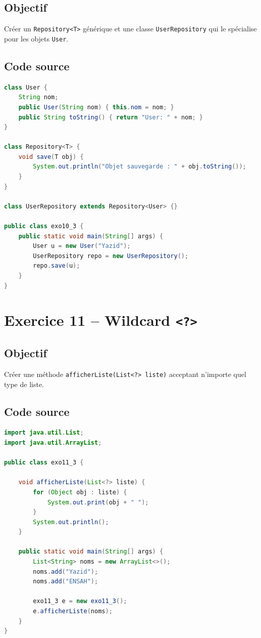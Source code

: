 \subsection{Objectif}

Créer un \texttt{Repository<T>} générique et une classe
\texttt{UserRepository} qui le spécialise pour les objets \texttt{User}.

\subsection{Code source}

\begin{lstlisting}[language=Java, caption={exo10\_3.java -- Repository générique}]
class User {
    String nom;
    public User(String nom) { this.nom = nom; }
    public String toString() { return "User: " + nom; }
}

class Repository<T> {
    void save(T obj) {
        System.out.println("Objet sauvegarde : " + obj.toString());
    }
}

class UserRepository extends Repository<User> {}

public class exo10_3 {
    public static void main(String[] args) {
        User u = new User("Yazid");
        UserRepository repo = new UserRepository();
        repo.save(u);
    }
}
\end{lstlisting}

\section{Exercice 11 -- Wildcard \texttt{<?>}}

\subsection{Objectif}

Créer une méthode \texttt{afficherListe(List<?> liste)} acceptant
n'importe quel type de liste.

\subsection{Code source}

\begin{lstlisting}[language=Java, caption={exo11\_3.java -- Wildcard ?}]
import java.util.List;
import java.util.ArrayList;

public class exo11_3 {

    void afficherListe(List<?> liste) {
        for (Object obj : liste) {
            System.out.print(obj + " ");
        }
        System.out.println();
    }

    public static void main(String[] args) {
        List<String> noms = new ArrayList<>();
        noms.add("Yazid");
        noms.add("ENSAH");

        exo11_3 e = new exo11_3();
        e.afficherListe(noms);
    }
}
\end{lstlisting}

